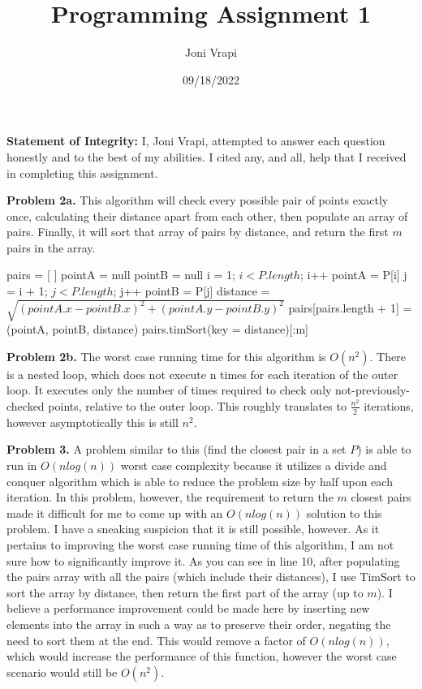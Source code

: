 \documentclass{article}
\title{Programming Assignment 1}
\author{Joni Vrapi}
\date{09/18/2022}
\begin{document}
\maketitle

\textbf{Statement of Integrity:} I, Joni Vrapi, attempted to answer each question honestly and to the best of my abilities. I cited any, and all, help that I received in completing this assignment.

\hfill

\textbf{Problem 2a.} This algorithm will check every possible pair of points exactly once, calculating their distance apart from each other, then populate an array of pairs. Finally, it will sort that array of pairs by distance, and return the first $m$ pairs in the array.

\begin{codebox}
    \li pairs = [ ]
    \li pointA = null
    \li pointB = null
    \li \For i = 1; $i < P.length$; i++ \Do
        \li pointA = P[i]
        \li \For j = i + 1; $j < P.length$; j++ \Do
        \li pointB = P[j]
        \li distance = $\sqrt{(pointA.x - pointB.x)^2 + (pointA.y - pointB.y)^2}$
        \li pairs[pairs.length + 1] = (pointA, pointB, distance)
        \li \Return pairs.timSort(key = distance)[:m]
            \End
        \End
\end{codebox}

\hfill

\textbf{Problem 2b.} The worst case running time for this algorithm is $O(n^2)$. There is a nested loop, which does not execute n times for each iteration of the outer loop. It executes only the number of times required to check only not-previously-checked points, relative to the outer loop. This roughly translates to $\frac{n^2}{2}$ iterations, however asymptotically this is still $n^2$.

\hfill

\textbf{Problem 3.} A problem similar to this (find the closest pair in a set $P$) is able to run in $O(nlog(n))$ worst case complexity because it utilizes a divide and conquer algorithm which is able to reduce the problem size by half upon each iteration. In this problem, however, the requirement to return the $m$ closest pairs made it difficult for me to come up with an $O(nlog(n))$ solution to this problem. I have a sneaking suspicion that it is still possible, however. As it pertains to improving the worst case running time of this algorithm, I am not sure how to significantly improve it. As you can see in line 10, after populating the pairs array with all the pairs (which include their distances), I use TimSort to sort the array by distance, then return the first part of the array (up to $m$). I believe a performance improvement could be made here by inserting new elements into the array in such a way as to preserve their order, negating the need to sort them at the end. This would remove a factor of $O(nlog(n))$, which would increase the performance of this function, however the worst case scenario would still be $O(n^2)$.
\end{document}
